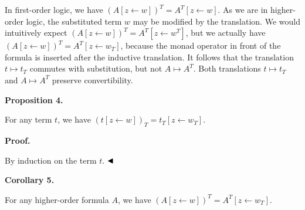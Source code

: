  
 
 
In first-order logic, we have $(A[z\leftarrow w])^{T}=A^{T}[z\leftarrow w]$. As we are in higher-order logic, the substituted term $w$ may be modified by the translation. We would intuitively expect $(A[z\leftarrow w])^{T}=A^{T}[z\leftarrow w^{T}]$, but we actually have $(A[z\leftarrow w])^{T}=A^{T}[z\leftarrow w_{T}]$, because the monad operator in front of the formula is inserted after the inductive translation. It follows that the translation $t\mapsto t_{T}$ commutes with substitution, but not $A\mapsto A^{T}$. Both translations $t\mapsto t_{T}$ and $A\mapsto A^{T}$ preserve convertibility.\par
 
 
 
\par\medskip\noindent\textbf{Proposition 4.}\par
 
 
For any term $t$, we have $(t[z\leftarrow w])_{T}=t_{T}[z\leftarrow w_{T}]$.\par
 
 
 
 
\par\medskip\noindent\textbf{Proof.}\par
 
 
By induction on the term $t$. $\hfill\blacktriangleleft$\par
 
 
 
\par\medskip\noindent\textbf{Corollary 5.}\par
 
 
For any higher-order formula $A$, we have $(A[z\leftarrow w])^{T}=A^{T}[z\leftarrow w_{T}]$.\par
 
 
 
